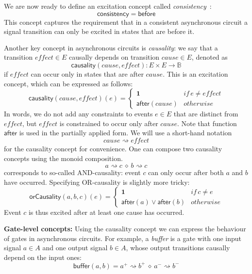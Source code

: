 \documentclass[british, journal]{IEEEtran}
\begin{document}
We are now ready to define an excitation concept called \emph{consistency}~\cite{Cortadella}:
\[
\mathsf{consistency}=\mathsf{before}
\]
This concept captures the requirement that in a consistent asynchronous
circuit a signal transition can only be excited in states that are
before it.

Another key concept in asynchronous circuits is \emph{causality}:
we say that a transition $\mathit{effect}\in E$ causally depends
on transition $\mathit{cause}\in E$, denoted as
\[
\mathsf{causality}(\mathit{cause},\mathit{effect}):E\times E\rightarrow\mathbb{B}
\]
 if $\mathit{effect}$ can occur only in states that are after $\mathit{cause}$.
This is an excitation concept, which can be expressed as follows:
\[
\mathsf{causality}(\mathit{cause},\mathit{effect})(e)\!=\!\begin{cases}
\mathbf{1} & \mathit{if}\, e\neq\mathit{effect}\\
\mathsf{after}(cause) & \mathit{otherwise}
\end{cases}
\]
In words, we do not add any constraints to events $e\in E$ that are
distinct from $\mathit{effect}$, but $\mathit{effect}$ is constrained
to occur only after $\mathit{cause}$. Note that function $\mathsf{after}$
is used in the partially applied form. We will use a short-hand notation
\[
\mathit{cause}\rightsquigarrow\mathit{effect}
\]
for the causality concept for convenience.
One can compose two causality concepts using the monoid composition.
\[
a\rightsquigarrow c\ \diamond\ b\rightsquigarrow c
\]
corresponds to so-called AND-causality: event $c$ can only occur
after both $a$ and $b$ have occurred. Specifying OR-causality is
slightly more tricky:
\[
\mathsf{orCausality}(a,b,c)(e)=\begin{cases}
\mathbf{1} & \mathit{if}\, c\neq\mathit{e}\\
\mathsf{after}(a)\vee\mathsf{after}(b) & \mathit{otherwise}
\end{cases}
\]
Event $c$ is thus excited after at least one cause has occurred.

\textbf{Gate-level concepts:} Using the causality concept we can express
the behaviour of gates in asynchronous circuits. For example, a \emph{buffer}
is a gate with one input signal $a\in A$ and one output signal $b\in A$,
whose output transitions causally depend on the input ones:
\[
\mathsf{buffer}(a, b)=a^{+}\rightsquigarrow b^{+}\ \diamond\ a^{-}\rightsquigarrow b^{-}
\]
\end{document}
